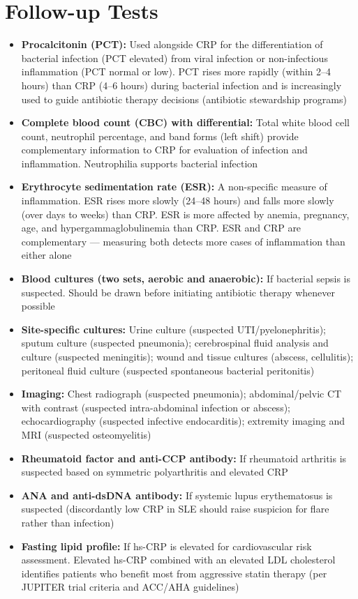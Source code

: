 \section*{Follow-up Tests}
\begin{itemize}
  \item \textbf{Procalcitonin (PCT):} Used alongside CRP for the differentiation of bacterial infection (PCT elevated) from viral infection or non-infectious inflammation (PCT normal or low). PCT rises more rapidly (within 2--4 hours) than CRP (4--6 hours) during bacterial infection and is increasingly used to guide antibiotic therapy decisions (antibiotic stewardship programs)
  \item \textbf{Complete blood count (CBC) with differential:} Total white blood cell count, neutrophil percentage, and band forms (left shift) provide complementary information to CRP for evaluation of infection and inflammation. Neutrophilia supports bacterial infection
  \item \textbf{Erythrocyte sedimentation rate (ESR):} A non-specific measure of inflammation. ESR rises more slowly (24--48 hours) and falls more slowly (over days to weeks) than CRP. ESR is more affected by anemia, pregnancy, age, and hypergammaglobulinemia than CRP. ESR and CRP are complementary --- measuring both detects more cases of inflammation than either alone
  \item \textbf{Blood cultures (two sets, aerobic and anaerobic):} If bacterial sepsis is suspected. Should be drawn before initiating antibiotic therapy whenever possible
  \item \textbf{Site-specific cultures:} Urine culture (suspected UTI/pyelonephritis); sputum culture (suspected pneumonia); cerebrospinal fluid analysis and culture (suspected meningitis); wound and tissue cultures (abscess, cellulitis); peritoneal fluid culture (suspected spontaneous bacterial peritonitis)
  \item \textbf{Imaging:} Chest radiograph (suspected pneumonia); abdominal/pelvic CT with contrast (suspected intra-abdominal infection or abscess); echocardiography (suspected infective endocarditis); extremity imaging and MRI (suspected osteomyelitis)
  \item \textbf{Rheumatoid factor and anti-CCP antibody:} If rheumatoid arthritis is suspected based on symmetric polyarthritis and elevated CRP
  \item \textbf{ANA and anti-dsDNA antibody:} If systemic lupus erythematosus is suspected (discordantly low CRP in SLE should raise suspicion for flare rather than infection)
  \item \textbf{Fasting lipid profile:} If hs-CRP is elevated for cardiovascular risk assessment. Elevated hs-CRP combined with an elevated LDL cholesterol identifies patients who benefit most from aggressive statin therapy (per JUPITER trial criteria and ACC/AHA guidelines)
\end{itemize}

